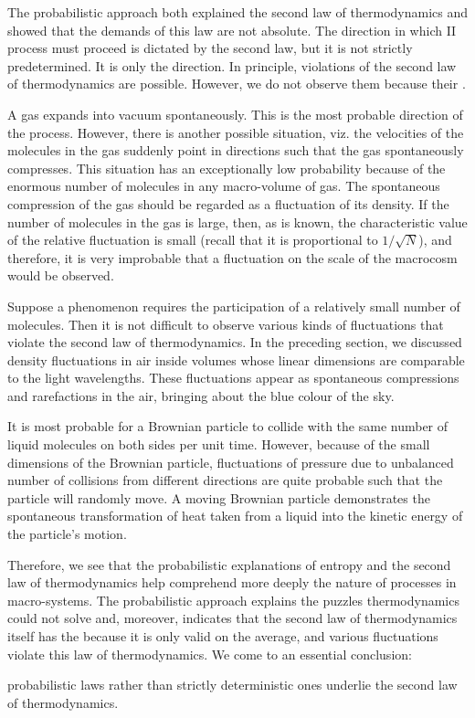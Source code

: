  The probabilistic approach both explained the second law of thermodynamics and showed that the demands of this law are not absolute. The direction in which II process must proceed is dictated by the second law, but it is not strictly predetermined. It is only the  direction. In principle, violations of the second law of thermodynamics are possible. However, we do not observe them because their .

A gas expands into vacuum spontaneously. This is the most probable direction of the process. However, there is another possible situation, viz. the velocities of the molecules in the gas suddenly point in directions such that the gas spontaneously compresses. This situation has an exceptionally low probability because of the enormous number of molecules in any macro-volume of gas. The spontaneous compression of the gas should be regarded as a fluctuation of its density. If the number of molecules in the gas is large, then, as is known, the characteristic value of the relative fluctuation is small (recall that it is proportional to $1 / \sqrt{N}$), and therefore, it is very improbable that a fluctuation on the scale of the macrocosm would be observed.

Suppose a phenomenon requires the participation of a relatively small number of molecules. Then it is not difficult to observe various kinds of fluctuations that violate the second law of thermodynamics. In the preceding section, we discussed density fluctuations in air inside volumes
whose linear dimensions are comparable to the light wavelengths. These fluctuations appear as spontaneous compressions and rarefactions in the air, bringing about the blue colour of the sky.

It is most probable for a Brownian particle to collide with the same number of liquid molecules on both sides per unit time. However, because of the small dimensions of the Brownian particle, fluctuations of pressure due to unbalanced number of collisions from different directions are quite probable such that the particle will randomly move. A moving Brownian	particle demonstrates the	spontaneous transformation of heat taken from a liquid into the kinetic energy of the particle's motion.

Therefore, we see that the probabilistic explanations of entropy and the second law of thermodynamics help comprehend more deeply the nature of processes in macro-systems. The probabilistic approach explains the puzzles thermodynamics could not solve and, moreover, indicates that the second law of thermodynamics itself has the  because it is only valid on the average, and various fluctuations violate this law of thermodynamics. We come to an essential conclusion: 
\begin{mybox}{}
probabilistic laws rather than strictly deterministic ones underlie the second law of thermodynamics.
\end{mybox}



